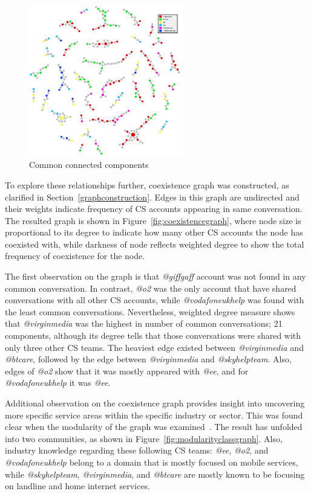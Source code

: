\documentclass[sigconf]{acmart}
\begin{document}
{\begin{figure}[htb]
\centering
\includegraphics[width=0.6\textwidth]{images/commoncc.png}
\caption{Common connected components}
\label{fig:commoncc}
\end{figure}

To explore these relationships further, coexistence graph was
constructed, as clarified in Section~\ref{graphconstruction}. 
Edges in this graph are undirected and their weights indicate frequency
of CS accounts appearing in same conversation. The resulted
graph is shown in Figure~\ref{fig:coexistencegraph}, where node
size is proportional to its degree to indicate how many other CS accounts the
node has coexisted with, while darkness of node reflects weighted
degree to show the total frequency of coexistence for the node.

The first observation on the graph is that {\emph{@giffgaff}} account
was not found in any common conversation. In contrast, {\emph{@o2}}
was the only account that have shared conversations with all other CS
accounts, while {\emph{@vodafoneukhelp}} was found with the least
common conversations. Nevertheless, weighted degree measure shows that
{\emph{@virginmedia}} was the highest in number of common
conversations; 21 components, although its degree tells that those
conversations were shared with only three other CS teams. The heaviest
edge existed between {\emph{@virginmedia}} and {\emph{@btcare}},
followed by the edge between {\emph{@virginmedia}} and
{\emph{@skyhelpteam}}. Also, edges of {\emph{@o2}} show that it was
mostly appeared with {\emph{@ee}}, and for {\emph{@vodafoneukhelp}} it
was {\emph{@ee}}.

Additional observation on the coexistence graph provides insight into
uncovering more specific service areas within the specific industry or
sector. This was found clear when the modularity of the graph was
examined~\cite{Blondel2008}. The result has unfolded into two
communities, as shown in Figure~\ref{fig:modularityclassgraph}. Also,
industry knowledge regarding these following CS teams: {\emph{@ee}},
{\emph{@o2}}, and {\emph{@vodafoneukhelp}} belong to a domain that is
mostly focused on mobile services, while {\emph{@skyhelpteam}},
{\emph{@virginmedia}}, and {\emph{@btcare}} are mostly known to be
focusing on landline and home internet services.

}
\end{document}
